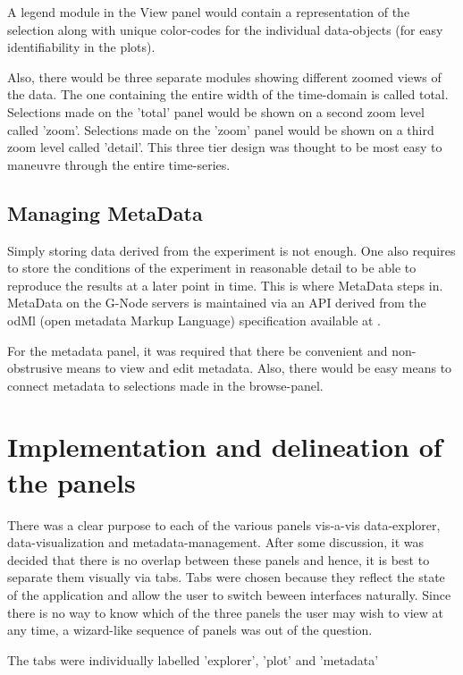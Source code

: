 A legend module in the View panel would contain a representation of
the selection along with unique color-codes for the individual
data-objects (for easy identifiability in the plots).

Also, there would be three separate modules showing different zoomed
views of the data.  The one containing the entire width of the
time-domain is called total.  Selections made on the 'total' panel
would be shown on a second zoom level called 'zoom'.  Selections made
on the 'zoom' panel would be shown on a third zoom level called
'detail'.  This three tier design was thought to be most easy to
maneuvre through the entire time-series.

\subsection{Managing MetaData}

Simply storing data derived from the experiment is not enough.  One
also requires to store the conditions of the experiment in reasonable
detail to be able to reproduce the results at a later point in time.
This is where MetaData steps in.  MetaData on the G-Node servers is
maintained via an API derived from the odMl (open metadata Markup
    Language) specification available at
.

For the metadata panel, it was required that there be convenient and
non-obstrusive means to view and edit metadata.  Also, there would be
easy means to connect metadata to selections made in the browse-panel.


\section{Implementation and delineation of the panels}

There was a clear purpose to each of the various panels vis-a-vis
data-explorer, data-visualization and metadata-management.  After some
discussion, it was decided that there is no overlap between these
panels and hence, it is best to separate them visually via tabs.  Tabs
were chosen because they reflect the state of the application and
allow the user to switch beween interfaces naturally.  Since there is
no way to know which of the three panels the user may wish to view at
any time, a wizard-like sequence of panels was out of the question.

The tabs were individually labelled 'explorer', 'plot' and 'metadata'
